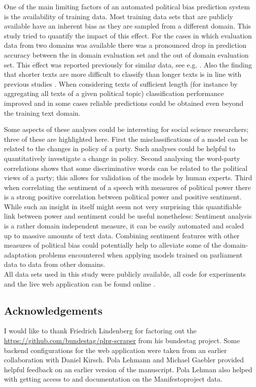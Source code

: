 \documentclass{article}
\begin{document}
One of the main limiting factors of an automated political bias prediction system is the availability of training data. Most training data sets that are publicly available have an inherent bias as they are sampled from a different domain. This study tried to quantify the impact of this effect. 
For the cases in which evaluation data from two domains was available there was a pronounced drop in prediction accuracy between the in domain evaluation set and the out of domain evaluation set. This effect was reported previously for similar data, see e.g. \cite{Yu2008}. Also the finding that shorter texts are more difficult to classify than longer texts is in line with previous studies \cite{Hirst2014}. When considering texts of sufficient length (for instance by aggregating all texts of a given political topic) classification performance improved and in some cases reliable predictions could be obtained even beyond the training text domain.

Some aspects of these analyses could be interesting for social science researchers; three of these are highlighted here.
First the misclassifications of a model can be related to the changes in policy of a party. Such analyses could be helpful to quantitatively investigate a change in policy. Second analysing the word-party correlations shows that some discriminative words can be related to the political views of a party; this allows for validation of the models by human experts. Third when correlating the sentiment of a speech with measures of political power there is a strong positive correlation between political power and positive sentiment. While such an insight in itself might seem not very surprising this quantifiable link between power and sentiment could be useful nonetheless: Sentiment analysis is a rather domain independent measure, it can be easily automated and scaled up to massive amounts of text data. Combining sentiment features with other measures of political bias could potentially help to alleviate some of the domain-adaptation problems encountered when applying models trained on parliament data to data from other domains. \\


All data sets used in this study were publicly available, all code for experiments and the live web application can be found online \cite{fipi, fipidemo}.

\subsection*{Acknowledgements}
I would like to thank Friedrich Lindenberg for factoring out the \url{https://github.com/bundestag/plpr-scraper} from his bundestag project. Some backend configurations for the web application were taken from an earlier collaboration with Daniel Kirsch. Pola Lehmann and Michael Gaebler provided helpful feedback on an earlier version of the manuscript. Pola Lehman also helped with getting access to and documentation on the Manifestoproject data. 
%
\small{

 
}
\end{document}
